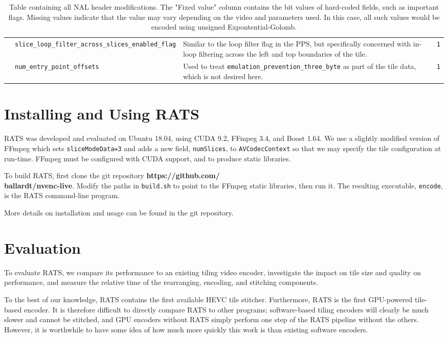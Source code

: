 \begin{table}[t]
\begin{tabular}{llp{3in}r}
		& \texttt{slice\_loop\_filter\_across\_slices\_enabled\_flag} & Similar to the loop filter flag in the PPS, but specifically concerned with in-loop filtering across the left and top boundaries of the tile. & \texttt{1} \\ \cmidrule[0.5pt]{2-4}
		& \texttt{num\_entry\_point\_offsets} & Used to treat \texttt{emulation\_prevention\_three\_byte} as part of the tile data, which is not desired here. & \texttt{1} \\
		\bottomrule
	\end{tabular}
	\caption{Table containing all NAL header modifications. The "Fixed value" column contains the bit values of hard-coded fields, such as important flags. Missing values indicate that the value may vary depending on the video and parameters used. In this case, all such values would be encoded using unsigned Expontential-Golomb.}
	\label{tab:stitch}
\end{table}
\renewcommand{\figurename}{Fig.}
\setcounter{figure}{2}

\section{Installing and Using RATS}
RATS was developed and evaluated on Ubuntu 18.04, using CUDA 9.2, FFmpeg 3.4, and Boost 1.64. We use a slightly modified version of FFmpeg which sets \texttt{sliceModeData=3} and adds a new field, \texttt{numSlices}, to \texttt{AVCodecContext} so that we may specify the tile configuration at run-time. FFmpeg must be configured with CUDA support, and to produce static libraries.

To build RATS, first clone the git repository \textbf{https://github.com/\\ballardt/nvenc-live}. Modify the paths in \texttt{build.sh} to point to the FFmpeg static libraries, then run it. The resulting executable, \texttt{encode}, is the RATS command-line program.

More details on installation and usage can be found in the git repository.

\section{Evaluation}
To evaluate RATS, we compare its performance to an existing tiling video encoder, investigate the impact on tile size and quality on performance, and measure the relative time of the rearranging, encoding, and stitching components.

To the best of our knowledge, RATS contains the first available HEVC tile stitcher. Furthermore, RATS is the first GPU-powered tile-based encoder. It is therefore difficult to directly compare RATS to other programs; software-based tiling encoders will clearly be much slower and cannot be stitched, and GPU encoders without RATS simply perform one step of the RATS pipeline without the others. However, it is worthwhile to have some idea of how much more quickly this work is than existing software encoders.

